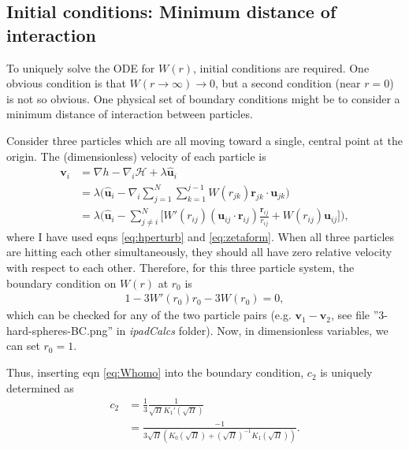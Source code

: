 \documentclass{article}
\begin{document}

\subsection{Initial conditions: Minimum distance of interaction}

To uniquely solve the ODE for $W(r)$, initial conditions are required. One obvious condition
is that $W(r\to\infty)\to0$, but a second condition (near $r=0$) is not so obvious. One
physical set of boundary conditions might be to consider a minimum distance of interaction
between particles.

Consider three particles which are all moving toward a single, central point at the origin.
The (dimensionless) velocity of each particle is
\begin{align}
  \bm{v}_i&=\nabla h -\nabla_i\mathcal{H} + \lambda \bm{\hat{u}}_i\nonumber\\
          &=\lambda \bigg(\bm{\hat{u}}_i-\nabla_i\sum_{j=1}^N\sum_{k=1}^{j-1}W(r_{jk})
            \bm{r}_{jk}\cdot\bm{u}_{jk}\bigg)\nonumber\\
          &=\lambda \bigg(\bm{\hat{u}}_i-\sum_{j\neq i}^N \bigg[W'(r_{ij})
            (\bm{u}_{ij}\cdot\bm{r}_{ij})\frac{\bm{r}_{ij}}{r_{ij}}
            +W(r_{ij})\bm{u}_{ij}\bigg]\bigg),
\end{align}
where I have used eqns \ref{eq:hperturb} and \ref{eq:zetaform}. When all three particles are
hitting each other simultaneously, they should all have zero relative velocity with respect
to each other. Therefore, for this three particle system, the boundary condition on $W(r)$
at $r_0$ is
\begin{align}
  1-3W'(r_0)r_0-3W(r_0)=0,
\end{align}
which can be checked for any of the two particle pairs (e.g. $\bm{v}_1-\bm{v}_2$, see file
''3-hard-spheres-BC.png'' in \textit{ipadCalcs} folder). Now, in dimensionless variables,
we can set $r_0=1$.

Thus, inserting eqn \ref{eq:Whomo} into the boundary condition, $c_2$ is uniquely determined
as
\begin{align}
  c_2 &= \frac{1}{3}\frac{1}{\sqrt{\Pi}K_1'(\sqrt{\Pi})}\nonumber\\
      &= \frac{-1}{3\sqrt{\Pi}(K_0(\sqrt{\Pi})
        +(\sqrt{\Pi})^{-1}K_1(\sqrt{\Pi}))}.
\end{align}

\end{document}
